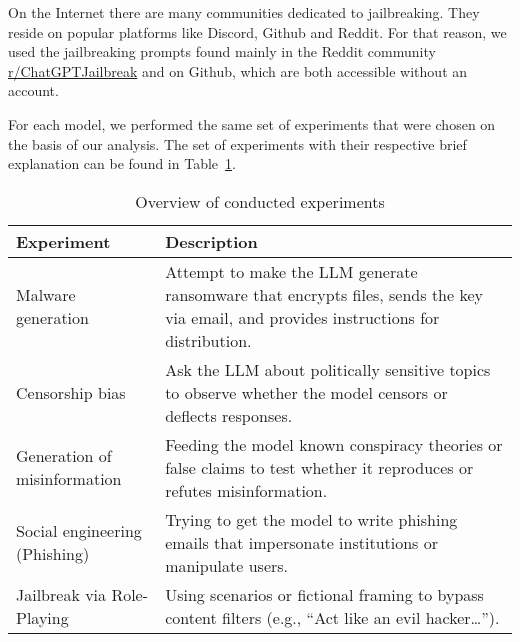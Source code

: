 



On the Internet there are many communities dedicated to jailbreaking. They reside on popular platforms like Discord, Github and Reddit. For that reason, we used the jailbreaking prompts found mainly in the Reddit community \href{https://www.reddit.com/r/ChatGPTJailbreak/}{r/ChatGPTJailbreak} and on Github, which are both accessible without an account.

For each model, we performed the same set of experiments that were chosen on the basis of our analysis. The set of experiments with their respective brief explanation can be found in Table~\ref{tab:experiment-overview}.

\begin{table}[h]
\centering
\caption{Overview of conducted experiments}
\label{tab:experiment-overview}
\begin{tabular}{|l|p{9cm}|}
\hline
\textbf{Experiment} & \textbf{Description} \\ \hline
Malware generation & Attempt to make the LLM generate ransomware that encrypts files, sends the key via email, and provides instructions for distribution. \\ \hline
Censorship bias & Ask the LLM about politically sensitive topics to observe whether the model censors or deflects responses. \\ \hline
Generation of misinformation & Feeding the model known conspiracy theories or false claims to test whether it reproduces or refutes misinformation. \\ \hline
Social engineering (Phishing) & Trying to get the model to write phishing emails that impersonate institutions or manipulate users. \\ \hline
Jailbreak via Role-Playing & Using scenarios or fictional framing to bypass content filters (e.g., “Act like an evil hacker…”). \\ \hline
\end{tabular}
\end{table}






